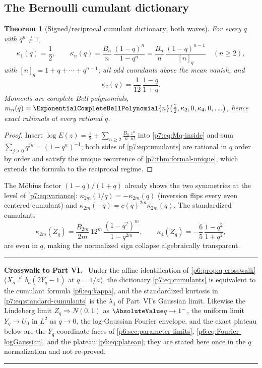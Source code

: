 \documentclass[11pt,oneside]{article}
\numberwithin{equation}{section}
\newtheorem{theorem}{Theorem}[section]
\theoremstyle{definition}
\theoremstyle{remark}
\newenvironment{statusbox}[1]{%
  \par\medskip\noindent\begin{center}\begin{minipage}{0.94\textwidth}%
  \color{linkblue}\hrule\vspace{0.65em}%
  \color{black}\textbf{\color{linkblue}#1.}\ }{%
  \par\vspace{0.65em}\color{linkblue}\hrule
  \end{minipage}\end{center}\medskip}
\begin{document}
\subsection{The Bernoulli cumulant dictionary}

\begin{theorem}[Signed/reciprocal cumulant dictionary; both waves]
\label{p7:thm:cumulants}
For every $q$ with $q^n\ne1$,
\begin{equation}\label{p7:eq:cumulants}
 \boxed{\ \kappa_1(q)=\frac12,
 \qquad
 \kappa_n(q)=\frac{B_n}{n}\,\frac{(1-q)^n}{1-q^n}
 =\frac{B_n}{n}\,\frac{(1-q)^{n-1}}{[n]_q}
 \quad(n\ge2),\ }
\end{equation}
with $[n]_q=1+q+\cdots+q^{n-1}$; all odd cumulants above the mean vanish, and
\begin{equation}\label{p7:eq:variance}
 \kappa_2(q)=\frac1{12}\,\frac{1-q}{1+q}.
\end{equation}
Moments are complete Bell polynomials,
$m_n(q)=\ExponentialCompleteBellPolynomial{n}\bigl(\tfrac12,\kappa_2,0,\kappa_4,0,\ldots\bigr)$, hence exact
rationals at every rational $q$.
\end{theorem}

\begin{proof}
Insert $\log E(z)=\tfrac z2+\sum_{n\ge2}\tfrac{B_n}{n}\tfrac{z^n}{n!}$ into
\eqref{p7:eq:Mq-inside} and sum $\sum_{j\ge0}q^{jn}=(1-q^n)^{-1}$; both sides
of \eqref{p7:eq:cumulants} are rational in $q$ order by order and satisfy the
unique recurrence of \cref{p7:thm:formal-unique}, which extends the formula to
the reciprocal regime.
\end{proof}

The M\"obius factor $(1-q)/(1+q)$ already shows the two symmetries at the
level of \eqref{p7:eq:variance}: $\kappa_{2m}(1/q)=-\kappa_{2m}(q)$ (inversion
flips every even centered cumulant) and
$\kappa_{2m}(-q)=c(q)^{2m}\kappa_{2m}(q)$.  The standardized cumulants
\begin{equation}\label{p7:eq:standard-cumulants}
 \kappa_{2m}(Z_q)=\frac{B_{2m}}{2m}\,12^m\,
 \frac{(1-q^2)^m}{1-q^{2m}},
 \qquad
 \kappa_4(Z_q)=-\frac65\,\frac{1-q^2}{1+q^2},
\end{equation}
are even in $q$, making the normalized sign collapse algebraically
transparent.

\begin{statusbox}{Crosswalk to Part VI}
Under the affine identification of \cref{p6:prop:q-crosswalk}
($X_a\overset d=b_a(2Y_q-1)$ at $q=1/a$), the dictionary
\eqref{p7:eq:cumulants} is equivalent to the cumulant formula
\eqref{p6:eq:kappa}, and the standardized kurtosis in
\eqref{p7:eq:standard-cumulants} is the $\lambda_4$ of Part~VI's Gaussian
limit.  Likewise the Lindeberg limit $Z_q\Rightarrow N(0,1)$ as
$\AbsoluteValue q\to1^-$, the uniform limit $Y_q\to U_0$ in $L^2$ as $q\to0$, the
log-Gaussian Fourier envelope, and the exact plateau below are the
$Y_q$-coordinate faces of \cref{p6:sec:parameter-limits},
\cref{p6:eq:Fourier-logGaussian}, and the plateau
\eqref{p6:eq:plateau}; they are stated here once in the $q$ normalization and
not re-proved.
\end{statusbox}
\end{document}
